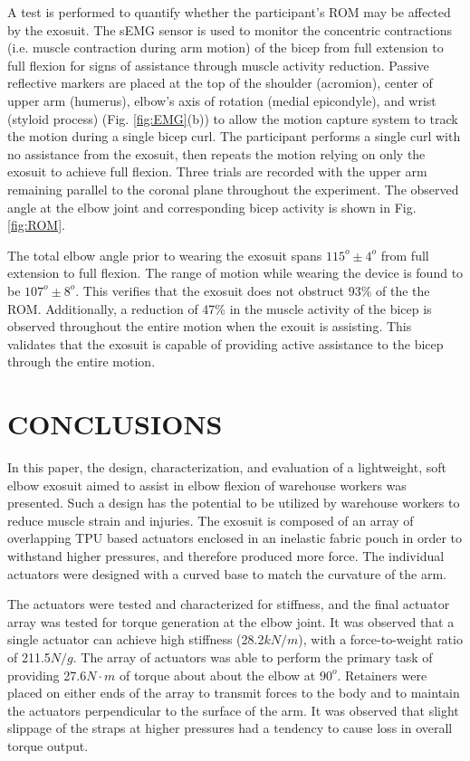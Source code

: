\documentclass[letterpaper, 10 pt, conference]{ieeeconf}  %
\begin{document}
A test is performed to quantify whether the participant's ROM may be affected by the exosuit. The sEMG sensor is used to monitor the concentric contractions (i.e. muscle contraction during arm motion) of the bicep from full extension to full flexion for signs of assistance through muscle activity reduction. Passive reflective markers are placed at the top of the shoulder (acromion), center of upper arm (humerus), elbow’s axis of rotation (medial epicondyle), and wrist (styloid process) (Fig. \ref{fig:EMG}(b)) to allow the motion capture system to track the motion during a single bicep curl. The participant  performs a single curl with no assistance from the exosuit, then repeats the motion relying on only the exosuit to achieve full flexion. Three trials are recorded with the upper arm remaining parallel to the coronal plane throughout the experiment. The observed angle at the elbow joint and corresponding bicep activity is shown in Fig. \ref{fig:ROM}.

The total elbow angle prior to wearing the exosuit spans $115^o \pm 4^o$ from full extension to full flexion. The range of motion while wearing the device is found to be $107^o \pm 8^o$. This verifies that the exosuit does not obstruct  $93\%$ of the the ROM.  Additionally, a reduction of 47\% in the muscle activity of the bicep is observed throughout the entire motion when the exouit is assisting.  This validates that the exosuit is capable of providing active assistance to the bicep through the entire motion.

\section{CONCLUSIONS}

In this paper, the design, characterization, and evaluation of a lightweight, soft elbow exosuit aimed to assist in elbow flexion of warehouse workers was presented. Such a design has the potential to be utilized by warehouse workers to reduce muscle strain and injuries. The exosuit is composed of an array of overlapping TPU based actuators enclosed in an inelastic fabric pouch in order to  withstand higher pressures, and therefore produced more force.  The individual actuators were designed with a curved base to match the curvature of the arm. 

The actuators were tested and characterized for stiffness, and the final actuator array was tested for torque generation at the elbow joint. It was observed that a single actuator can achieve high stiffness (28.2$kN/m$), with a force-to-weight ratio of 211.5$N/g$. The array of actuators was able to perform the primary task of providing 27.6$ N{\cdot}m$ of torque about about the elbow at $90^o$. Retainers were placed on either ends of the array to transmit forces to the body and to maintain the actuators perpendicular to the surface of the arm. It was observed that slight slippage of the straps at higher pressures had a tendency to cause loss in overall torque output.
\end{document}
